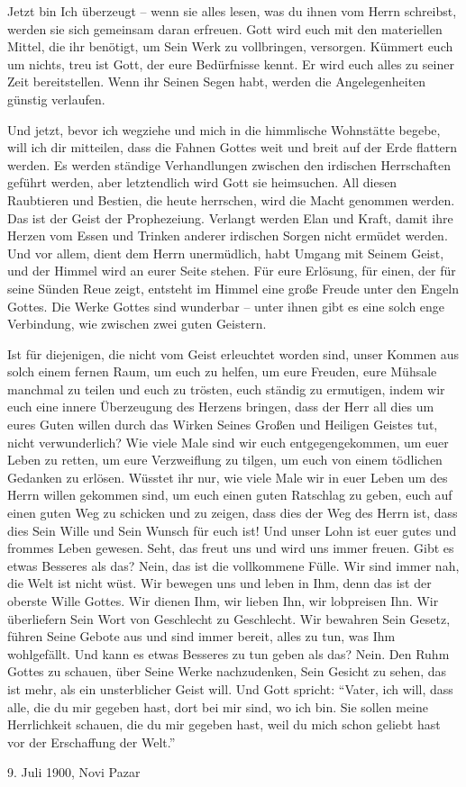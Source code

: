Jetzt bin Ich überzeugt -- wenn sie alles lesen, was du ihnen vom Herrn schreibst, werden sie sich gemeinsam daran erfreuen. Gott wird euch mit den materiellen Mittel, die ihr benötigt, um Sein Werk zu vollbringen, versorgen. Kümmert euch um nichts, treu ist Gott, der eure Bedürfnisse kennt. Er wird euch alles zu seiner Zeit bereitstellen. Wenn ihr Seinen Segen habt, werden die Angelegenheiten günstig verlaufen.

Und jetzt, bevor ich wegziehe und mich in die himmlische Wohnstätte begebe, will ich dir mitteilen, dass die Fahnen Gottes weit und breit auf der Erde flattern werden. Es werden ständige Verhandlungen zwischen den irdischen Herrschaften geführt werden, aber letztendlich wird Gott sie heimsuchen. All diesen Raubtieren und Bestien, die heute herrschen, wird die Macht genommen werden. Das ist der Geist der Prophezeiung. Verlangt werden Elan und Kraft, damit ihre Herzen vom Essen und Trinken anderer irdischen Sorgen nicht ermüdet werden. Und vor allem, dient dem Herrn unermüdlich, habt Umgang mit Seinem Geist, und der Himmel wird an eurer Seite stehen. Für eure Erlösung, für einen, der für seine Sünden Reue zeigt, entsteht im Himmel eine große Freude unter den Engeln Gottes. Die Werke Gottes sind wunderbar -- unter ihnen gibt es eine solch enge Verbindung, wie zwischen zwei guten Geistern.

Ist für diejenigen, die nicht vom Geist erleuchtet worden sind, unser Kommen aus solch einem fernen Raum, um euch zu helfen, um eure Freuden, eure Mühsale manchmal zu teilen und euch zu trösten, euch ständig zu ermutigen, indem wir euch eine innere Überzeugung des Herzens bringen, dass der Herr all dies um eures Guten willen durch das Wirken Seines Großen und Heiligen Geistes tut, nicht verwunderlich? Wie viele Male sind wir euch entgegengekommen, um euer Leben zu retten, um eure Verzweiflung zu tilgen, um euch von einem tödlichen Gedanken zu erlösen. Wüsstet ihr nur, wie viele Male wir in euer Leben um des Herrn willen gekommen sind, um euch einen guten Ratschlag zu geben, euch auf einen guten Weg zu schicken und zu zeigen, dass dies der Weg des Herrn ist, dass dies Sein Wille und Sein Wunsch für euch ist! Und unser Lohn ist euer gutes und frommes Leben gewesen. Seht, das freut uns und wird uns immer freuen. Gibt es etwas Besseres als das? Nein, das ist die vollkommene Fülle. Wir sind immer nah, die Welt ist nicht wüst. Wir bewegen uns und leben in Ihm, denn das ist der oberste Wille Gottes. Wir dienen Ihm, wir lieben Ihn, wir lobpreisen Ihn. Wir überliefern Sein Wort von Geschlecht zu Geschlecht. Wir bewahren Sein Gesetz, führen Seine Gebote aus und sind immer bereit, alles zu tun, was Ihm wohlgefällt. Und kann es etwas Besseres zu tun geben als das? Nein. Den Ruhm Gottes zu schauen, über Seine Werke nachzudenken, Sein Gesicht zu sehen, das ist mehr, als ein unsterblicher Geist will. Und Gott spricht: "`Vater, ich will, dass alle, die du mir gegeben hast, dort bei mir sind, wo ich bin. Sie sollen meine Herrlichkeit schauen, die du mir gegeben hast, weil du mich schon geliebt hast vor der Erschaffung der Welt."'



9. Juli 1900, Novi Pazar






